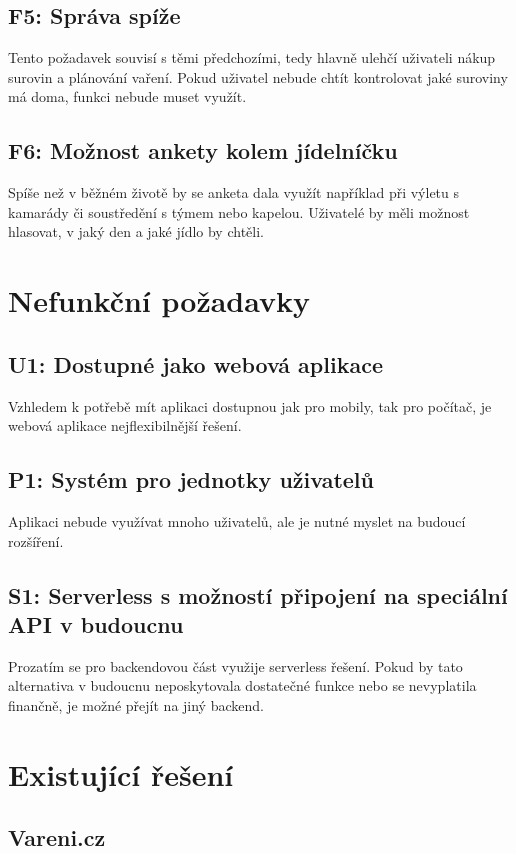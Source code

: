\subsection{F5: Správa spíže}
Tento požadavek souvisí s těmi předchozími, tedy hlavně ulehčí uživateli nákup surovin a plánování vaření. Pokud uživatel nebude chtít
kontrolovat jaké suroviny má doma, funkci nebude muset využít.
\subsection{F6: Možnost ankety kolem jídelníčku}
Spíše než v běžném životě by se anketa dala využít například při výletu s kamarády či soustředění s týmem nebo kapelou. Uživatelé
by měli možnost hlasovat, v jaký den a jaké jídlo by chtěli.

\section{Nefunkční požadavky}

\subsection{U1: Dostupné jako webová aplikace}
Vzhledem k potřebě mít aplikaci dostupnou jak pro mobily, tak pro počítač, je webová aplikace nejflexibilnější řešení.
\subsection{P1: Systém pro jednotky uživatelů}
Aplikaci nebude využívat mnoho uživatelů, ale je nutné myslet na budoucí rozšíření.
\subsection{S1: Serverless s možností připojení na speciální API v budoucnu}
Prozatím se pro backendovou část využije serverless řešení. Pokud by tato alternativa v budoucnu neposkytovala dostatečné
funkce nebo se nevyplatila finančně, je možné přejít na jiný backend.

\section{Existující řešení}

\subsection{Vareni.cz}

